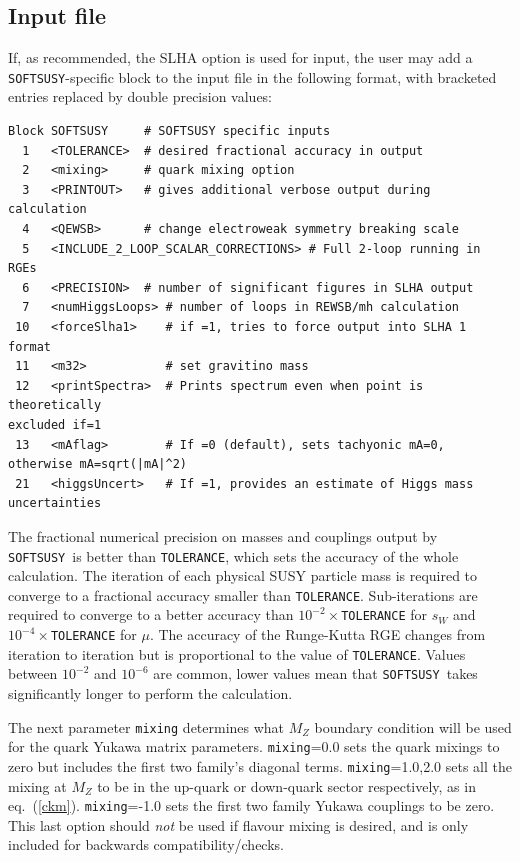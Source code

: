 \documentclass{article}
\def\SOFTSUSY{{\tt SOFTSUSY}}
\def\code#1{\small{\tt #1}\normalsize}
\begin{document}
\subsection{Input file \label{sec:input}}

If, as recommended, the SLHA option is used for input, the user may
add
a \SOFTSUSY-specific block to the input file in the following format, with
bracketed entries replaced by double precision values:
\small
\begin{verbatim}
Block SOFTSUSY     # SOFTSUSY specific inputs
  1   <TOLERANCE>  # desired fractional accuracy in output
  2   <mixing>     # quark mixing option
  3   <PRINTOUT>   # gives additional verbose output during calculation
  4   <QEWSB>      # change electroweak symmetry breaking scale
  5   <INCLUDE_2_LOOP_SCALAR_CORRECTIONS> # Full 2-loop running in RGEs
  6   <PRECISION>  # number of significant figures in SLHA output
  7   <numHiggsLoops> # number of loops in REWSB/mh calculation
 10   <forceSlha1>    # if =1, tries to force output into SLHA 1 format
 11   <m32>           # set gravitino mass
 12   <printSpectra>  # Prints spectrum even when point is theoretically
excluded if=1
 13   <mAflag>        # If =0 (default), sets tachyonic mA=0, otherwise mA=sqrt(|mA|^2)
 21   <higgsUncert>   # If =1, provides an estimate of Higgs mass uncertainties
\end{verbatim}
\normalsize
The fractional numerical precision on masses and couplings output by \SOFTSUSY~is better than \code{TOLERANCE}, which
sets the accuracy of the whole calculation. The iteration of
each physical SUSY particle mass is required to converge to a
fractional accuracy smaller than \code{TOLERANCE}. Sub-iterations are required
to converge to a better accuracy than $10^{-2}\times$\code{TOLERANCE} for
$s_W$ and 
$10^{-4}\times$\code{TOLERANCE} for $\mu$. The accuracy of the Runge-Kutta RGE
changes from iteration to iteration but is proportional to the value of 
\code{TOLERANCE}. Values between $10^{-2}$ and $10^{-6}$ are common, lower
values  
mean that \SOFTSUSY~takes significantly longer to perform the calculation.

The next parameter
\code{mixing} determines what $M_Z$ boundary condition will be used for the
quark Yukawa matrix parameters.
\code{mixing}=0.0 sets the quark mixings to zero but includes the first two 
family's diagonal terms.
\code{mixing}=1.0,2.0 sets all the mixing at $M_Z$
to be in the up-quark or down-quark
sector respectively, as in eq.~(\ref{ckm}).
\code{mixing}=-1.0 sets the first two family Yukawa couplings to be zero. This
last option should {\em not}\/ be used if flavour mixing is desired, and is
only included for backwards compatibility/checks.
\end{document}
